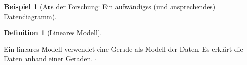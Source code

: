 \documentclass[
  a4paper,
]{scrbook}
\theoremstyle{definition}
\newtheorem{example}{Beispiel}[chapter]
\theoremstyle{definition}
\newtheorem{definition}{Definition}[chapter]
\theoremstyle{definition}
\theoremstyle{remark}
\begin{document}
\begin{example}[Aus der Forschung: Ein aufwändiges (und ansprechendes)
Datendiagramm]
\begin{definition}[Lineares
Modell]\protect\hypertarget{def-lm}{}\label{def-lm}

Ein lineares Modell verwendet eine Gerade als Modell der Daten. Es
erklärt die Daten anhand einer Geraden. \(\square\)

\end{definition}

\begin{figure}

\begin{minipage}{0.50\linewidth}



\end{minipage}%
%
\begin{minipage}{0.50\linewidth}

\end{minipage}
\end{figure}
\end{example}
\end{document}
